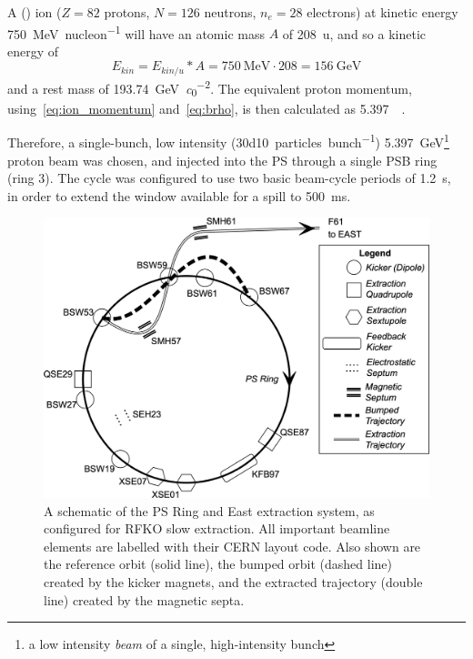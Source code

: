 \documentclass[a4paper,twoside,11pt]{report}
\begin{document}
A () ion ($Z=82$ protons, $N=126$ neutrons, $n_e=28$ electrons) at kinetic energy \qty[per-mode=symbol]{750}{\mega\electronvolt\per nucleon} will have an atomic mass $A$ of \qty{208}{\atomicmassunit}, and so a kinetic energy of 
\begin{equation}
  E_{kin}=E_{kin/u}*A=\qty{750}{\mega\electronvolt}\cdot 208=\qty{156}{\giga\electronvolt}
\end{equation}
and a rest mass of \qty{193.74}{\giga\electronvolt\per\clight\squared}. The equivalent proton momentum, using~\autoref{eq:ion_momentum} and~\autoref{eq:brho}, is then calculated as \qty{5.397}{\giga\eVperc}. 

Therefore, a single-bunch, low intensity (\qty[per-mode=symbol]{30d10}{particles\per bunch}) \qty{5.397}{\giga\electronvolt}\footnote{a low intensity \textit{beam} of a single, high-intensity bunch} proton beam was chosen, and injected into the PS through a single PSB ring (ring 3). The cycle was configured to use two basic beam-cycle periods of \qty{1.2}{\second}, in order to extend the window available for a spill to \qty{500}{\milli\second}.

\begin{figure}
  \centering
  \includegraphics*[width=\linewidth]{ps-sx-system.png}
  \caption[Schematic of the PS Ring and East extraction system configured for RFKO slow extraction]{A schematic of the PS Ring and East extraction system, as configured for RFKO slow extraction. All important beamline elements are labelled with their CERN layout code. Also shown are the reference orbit (solid line), the bumped orbit (dashed line) created by the kicker magnets, and the extracted trajectory (double line) created by the magnetic septa.}\label{fig:schematic}
\end{figure}
\end{document}
